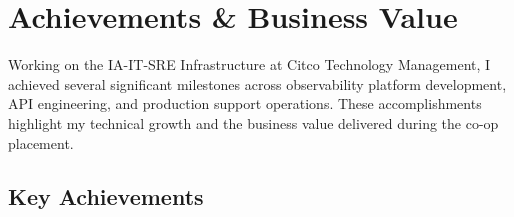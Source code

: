 ﻿%

\chapter{Achievements \& Business Value}
\label{chap:achievements}

Working on the IA-IT-SRE Infrastructure at Citco Technology Management,
I achieved several significant milestones across observability platform
development, API engineering, and production support operations. These
accomplishments highlight my technical growth and the business value
delivered during the co-op placement.


\FloatBarrier

\section{Key Achievements}
\label{sec:key_achievements}


